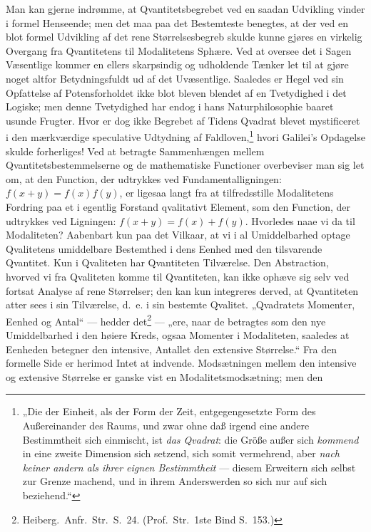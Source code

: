 \documentclass[12pt]{book}
\newcommand{\opage}[1]{\marginnote{\footnotesize\textit{[#1]}}}
\begin{document}
Man kan gjerne indrømme, at Qvantitetsbegrebet ved en saadan Udvikling vinder i formel Henseende; men
det maa paa det Bestemteste benegtes, at der ved en blot formel Udvikling af det rene Størrelsesbegreb
skulde kunne gjøres en virkelig Overgang fra Qvantitetens til Modalitetens Sphære. Ved at oversee det i
Sagen Væsentlige kommer en ellers skarpsindig og udholdende Tænker let til at gjøre noget altfor
Betydningsfuldt ud af det Uvæsentlige. Saaledes er Hegel ved sin Opfattelse af Potensforholdet ikke blot
bleven blendet af en Tvetydighed i det Logiske; men denne Tvetydighed har endog i hans Naturphilosophie
baaret usunde Frugter. Hvor er dog ikke Begrebet af Tidens Qvadrat blevet mystificeret i den
mærkværdige speculative Udtydning af Faldloven,\footnote{„Die der Einheit, als der Form der Zeit,
entgegengesetzte Form des Außereinander des Raums, und zwar ohne daß irgend eine andere Bestimmtheit
sich einmischt, ist \emph{das Qvadrat}: die Größe außer sich \emph{kommend} in eine zweite Dimension
sich setzend, sich somit vermehrend, aber \emph{nach keiner andern als ihrer eignen Bestimmtheit} ---
diesem Erweitern sich selbst zur Grenze machend, und in ihrem Anderswerden so sich nur auf sich
beziehend.“} hvori Galilei's Opdagelse skulde forherliges!
\opage{305} Ved at betragte Sammenhængen mellem Qvantitetsbestemmelserne og de mathematiske Functioner overbeviser
man sig let om, at den Function, der udtrykkes ved Fundamentalligningen: $f(x + y) = f(x) f(y)$, er
ligesaa langt fra at tilfredsstille Modalitetens Fordring paa et i egentlig Forstand qvalitativt
Element, som den Function, der udtrykkes ved Ligningen: $f(x + y) = f(x) + f(y)$. Hvorledes naae vi da
til Modaliteten? Aabenbart kun paa det Vilkaar, at vi i al Umiddelbarhed optage Qvalitetens umiddelbare
Bestemthed i dens Eenhed med den tilsvarende Qvantitet. Kun i Qvaliteten har Qvantiteten Tilværelse. Den
Abstraction, hvorved vi fra Qvaliteten komme til Qvantiteten, kan ikke ophæve sig selv ved fortsat
Analyse af rene Størrelser; den kan kun integreres derved, at Qvantiteten atter sees i sin Tilværelse,
d.\ e. i sin bestemte Qvalitet. „Qvadratets Momenter, Eenhed og Antal“ --- hedder det\footnote{Heiberg.\
Anfr.\ Str.\ S.~24. (Prof.\ Str.\ 1ste Bind S.~153.)} --- „ere, naar de betragtes som den nye
Umiddelbarhed i den høiere Kreds, ogsaa Momenter i Modaliteten, saaledes at Eenheden betegner den
intensive, Antallet den extensive Størrelse.“ Fra den formelle Side er herimod Intet at indvende.
Modsætningen mellem den intensive og extensive Størrelse er ganske vist en Modalitetsmodsætning; men den
\end{document}

